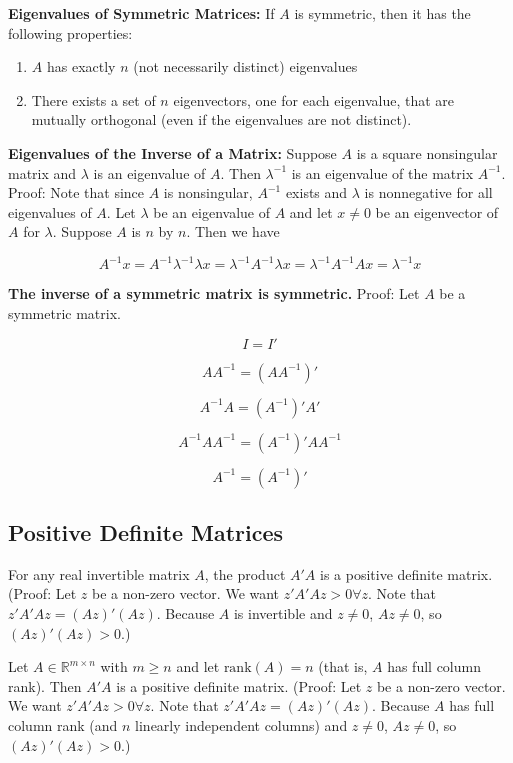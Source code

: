 \documentclass{article}
\begin{document}
\textbf{Eigenvalues of Symmetric Matrices:} If \(A\) is symmetric, then it has the following properties:

\begin{enumerate}[1.]

\item \(A\) has exactly \(n\) (not necessarily distinct) eigenvalues

\item There exists a set of \(n\) eigenvectors, one for each eigenvalue, that are mutually orthogonal (even if the eigenvalues are not distinct).

\end{enumerate}

\textbf{Eigenvalues of the Inverse of a Matrix:} Suppose \(A\) is a square nonsingular matrix and \(\lambda\) is an eigenvalue of \(A\). Then \(\lambda^{-1}\) is an eigenvalue of the matrix \(A^{-1}\). Proof: Note that since \(A\) is nonsingular, \(A^{-1}\) exists and \(\lambda\) is nonnegative for all eigenvalues of \(A\). Let \(\lambda\) be an eigenvalue of \(A\) and let \(x \neq 0\) be an eigenvector of \(A\) for \(\lambda\). Suppose \(A\) is \(n\) by \(n\). Then we have

\[
A^{-1}x = A^{-1}\lambda^{-1} \lambda x = \lambda^{-1} A^{-1} \lambda x = \lambda^{-1} A^{-1} A x = \lambda^{-1}x
\]

\textbf{The inverse of a symmetric matrix is symmetric.} Proof: Let \(A\) be a symmetric matrix.

\[
I = I'
\]

\[
A A^{-1} = (A A^{-1})'
\]

\[
A^{-1} A = (A^{-1})'A'
\]

\[
A^{-1} A A^{-1} = (A^{-1})'A A^{-1}
\]

\[
A^{-1} = (A^{-1})'
\]

\subsection{Positive Definite Matrices}

For any real invertible matrix \(A\), the product \(A' A\) is a positive definite matrix. (Proof: Let \(z\) be a non-zero vector. We want \(z' A' A z >0 \forall z\). Note that \(z' A' A z = (Az)'(Az)\). Because \(A\) is invertible and \(z \neq 0\), \(Az \neq 0 \), so \((Az)'(Az) > 0\).)

Let \(A \in \mathbb{R}^{m \times n}\) with \(m \geq n\) and let \(\text{rank}(A) = n\) (that is, \(A\) has full column rank). Then \(A' A\) is a positive definite matrix. (Proof: Let \(z\) be a non-zero vector. We want \(z' A' A z >0 \forall z\). Note that \(z' A' A z = (Az)'(Az)\). Because \(A\) has full column rank (and \(n\) linearly independent columns) and \(z \neq 0\), \(Az \neq 0 \), so \((Az)'(Az) > 0\).)
\end{document}
